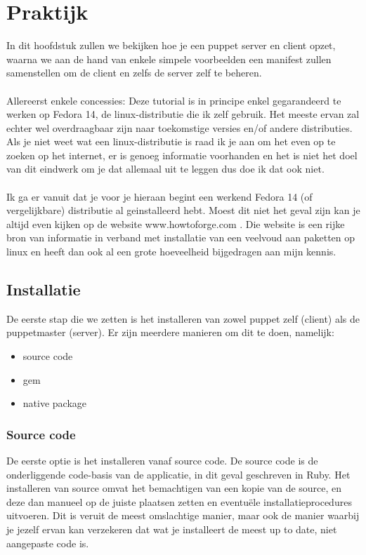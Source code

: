 \chapter{Praktijk}
In dit hoofdstuk zullen we bekijken hoe je een puppet server en client opzet, waarna we aan de hand van enkele simpele voorbeelden een manifest zullen samenstellen om de client en zelfs de server zelf te beheren.\\\\
Allereerst enkele concessies: Deze tutorial is in principe enkel gegarandeerd te werken op Fedora 14, de linux-distributie die ik zelf gebruik. Het meeste ervan zal echter wel overdraagbaar zijn naar toekomstige versies en/of andere distributies. Als je niet weet wat een linux-distributie is raad ik je aan om het even op te zoeken op het internet, er is genoeg informatie voorhanden en het is niet het doel van dit eindwerk om je dat allemaal uit te leggen dus doe ik dat ook niet.\\\\
Ik ga er vanuit dat je voor je hieraan begint een werkend Fedora 14 (of vergelijkbare) distributie al geinstalleerd hebt. Moest dit niet het geval zijn kan je altijd even kijken op de website www.howtoforge.com . Die website is een rijke bron van informatie in verband met installatie van een veelvoud aan paketten op linux en heeft dan ook al een grote hoeveelheid bijgedragen aan mijn kennis.


\section{Installatie}
De eerste stap die we zetten is het installeren van zowel puppet zelf (client) als de puppetmaster (server). Er zijn meerdere manieren om dit te doen, namelijk:
\begin{itemize}
\item source code
\item gem
\item native package
\end{itemize}

\subsection{Source code}
De eerste optie is het installeren vanaf source code. De source code is de onderliggende code-basis van de applicatie, in dit geval geschreven in Ruby. Het installeren van source omvat het bemachtigen van een kopie van de source, en deze dan manueel op de juiste plaatsen zetten en eventu\"{e}le installatieprocedures uitvoeren. Dit is veruit de meest omslachtige manier, maar ook de manier waarbij je jezelf ervan kan verzekeren dat wat je installeert de meest up to date, niet aangepaste code is.
